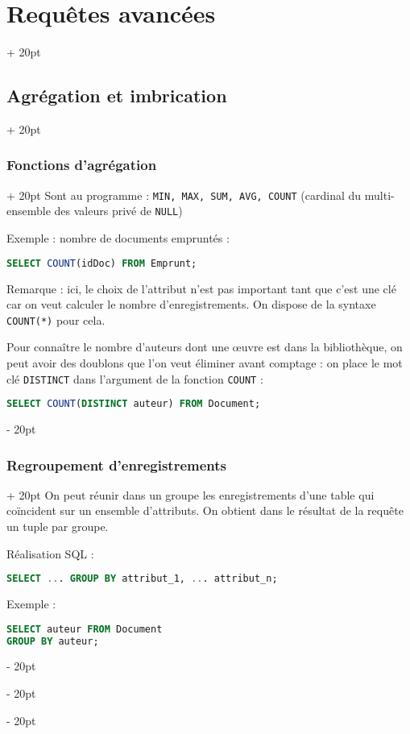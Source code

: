 \documentclass[a4paper, 12pt, twoside]{article}
\newcommand{\ind}[1][20pt]{\advance\leftskip + #1}
\newcommand{\deind}[1][20pt]{\advance\leftskip - #1}
\newenvironment{indt}[2][20pt]{#2 \par \ind[#1]}{\par \deind} %
\begin{document}
\begin{indt}{\section{Requêtes avancées}}
\begin{indt}{\subsection{Agrégation et imbrication}}
\begin{indt}{\subsubsection{Fonctions d'agrégation}}
                Sont au programme : \texttt{MIN, MAX, SUM, AVG, COUNT} (cardinal du multi-ensemble des valeurs privé de \texttt{NULL})

                Exemple : nombre de documents empruntés :

                \begin{lstlisting}[language=SQL, xleftmargin=80pt]
SELECT COUNT(idDoc) FROM Emprunt;\end{lstlisting}

                Remarque : ici, le choix de l'attribut n'est pas important tant que c'est  une clé car on veut calculer le nombre d'enregistrements. On dispose de la syntaxe \texttt{COUNT(*)} pour cela.

                \vspace{6pt}
                
                Pour connaître le nombre d'auteurs dont une \oe uvre est dans la bibliothèque, on peut avoir des doublons que l'on veut éliminer avant comptage : on place le mot clé \texttt{DISTINCT} dans l'argument de la fonction \texttt{COUNT} :

                \begin{lstlisting}[language=SQL, xleftmargin=80pt]
SELECT COUNT(DISTINCT auteur) FROM Document;\end{lstlisting}
            \end{indt}

            \vspace{12pt}
            
            \begin{indt}{\subsubsection{Regroupement d'enregistrements}}
                On peut réunir dans un groupe les enregistrements d'une table qui coïncident sur un ensemble d'attributs. On obtient dans le résultat de la requête un tuple par groupe.

                Réalisation SQL :

                \begin{lstlisting}[language=SQL, xleftmargin=80pt]
SELECT ... GROUP BY attribut_1, ... attribut_n;\end{lstlisting}

                Exemple :

                \begin{lstlisting}[language=SQL, xleftmargin=80pt]
SELECT auteur FROM Document
GROUP BY auteur;\end{lstlisting}


\end{indt}
\end{indt}
\end{indt}
\end{document}
